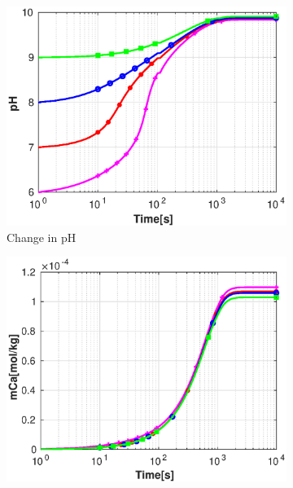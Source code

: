 \begin{figure}[!h]
        \centering
    \begin{subfigure}{.5\linewidth}
        \centering
        \includegraphics[width=\textwidth]{PICTURES/without_vel_pH.eps}
        \caption{Change in pH}
        \label{fig:withoutvelpH}       %
    \end{subfigure}%
        \hfill
    \begin{subfigure}{.5\linewidth}
        \centering
        \includegraphics[width=\textwidth]{PICTURES/without_vel_mCa.eps}

\end{subfigure}
\end{figure}

